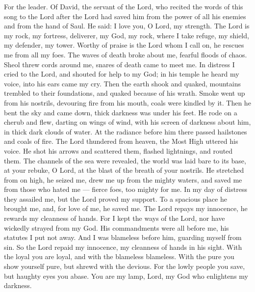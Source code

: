 For the leader. Of David, the servant of the Lord, who recited the words
of this song to the Lord after the Lord had saved him from the power of
all his enemies and from the hand of Saul. He said:  I love
you, O Lord, my strength.  The Lord is my rock, my fortress,
deliverer, my God, my rock, where I take refuge, my shield, my defender,
my tower.  Worthy of praise is the Lord whom I call on, he
rescues me from all my foes.  The waves of death broke about
me, fearful floods of chaos.  Sheol threw cords around me,
snares of death came to meet me.  In distress I cried to the
Lord, and shouted for help to my God; in his temple he heard my voice,
into his ears came my cry.  Then the earth shook and quaked,
mountains trembled to their foundations, and quaked because of his
wrath.  Smoke went up from his nostrils, devouring fire from
his mouth, coals were kindled by it.  Then he bent the sky
and came down, thick darkness was under his feet.  He rode
on a cherub and flew, darting on wings of wind,  with his
screen of darkness about him, in thick dark clouds of water.
 At the radiance before him there passed hailstones and
coals of fire.  The Lord thundered from heaven, the Most
High uttered his voice.  He shot his arrows and scattered
them, flashed lightnings, and routed them.  The channels of
the sea were revealed, the world was laid bare to its base, at your
rebuke, O Lord, at the blast of the breath of your nostrils.
 He stretched from on high, he seized me, drew me up from
the mighty waters,  and saved me from those who hated me
--- fierce foes, too mighty for me.  In my day of distress
they assailed me, but the Lord proved my support.  To a
spacious place he brought me, and, for love of me, he saved me.
 The Lord repays my innocence, he rewards my cleanness of
hands.  For I kept the ways of the Lord, nor have wickedly
strayed from my God.  His commandments were all before me,
his statutes I put not away.  And I was blameless before
him, guarding myself from sin.  So the Lord repaid my
innocence, my cleanness of hands in his sight.  With the
loyal you are loyal, and with the blameless blameless. 
With the pure you show yourself pure, but shrewd with the devious.
 For the lowly people you save, but haughty eyes you abase.
 You are my lamp, Lord, my God who enlightens my darkness.
